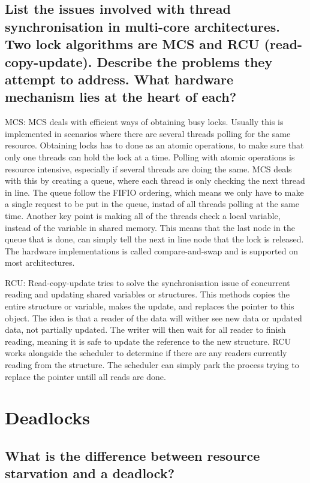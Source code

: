 \documentclass[a4paper]{article}
\begin{document}
\subsection{List the issues involved with thread synchronisation in multi-core architectures. Two lock algorithms
are MCS and RCU (read-copy-update). Describe the problems they attempt to address. What hardware mechanism lies at the heart of each?}

MCS:
MCS deals with efficient ways of obtaining busy locks. Usually this is implemented in scenarios where there are several threads polling for the same resource. Obtaining locks has to done as an atomic operations, to make sure that only one threads can hold the lock at a time. Polling with atomic operations is resource intensive, especially if several threads are doing the same. MCS deals with this by creating a queue, where each thread is only checking the next thread in line. The queue follow the FIFIO ordering, which means we only have to make a single request to be put in the queue, instad of all threads polling at the same time. Another key point is making all of the threads check a local variable, instead of the variable in shared memory. This means that the last node in the queue that is done, can simply tell the next in line node that the lock is released. The hardware implementations is called compare-and-swap and is supported on most architectures.


RCU:
Read-copy-update tries to solve the synchronisation issue of concurrent reading and updating shared variables or structures. This methods copies the entire structure or variable, makes the update, and replaces the pointer to this object. The idea is that a reader of the data will wither see new data or updated data, not partially updated. The writer will then wait for all reader to finish reading, meaning it is safe to update the reference to the new structure. RCU works alongside the scheduler to determine if there are any readers currently reading from the structure. The scheduler can simply park the process trying to replace the pointer untill all reads are done. 



\section{Deadlocks}


\subsection{What is the difference between resource starvation and a deadlock?}
\end{document}
